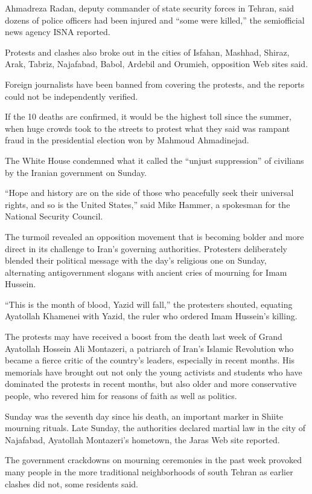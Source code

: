 ﻿\documentclass[12pt]{article}
\begin{document}
Ahmadreza Radan, deputy commander of state security forces in Tehran, said dozens of police officers
had been injured and ``some were killed,'' the semiofficial news agency ISNA reported.

Protests and clashes also broke out in the cities of Isfahan, Mashhad, Shiraz, Arak, Tabriz,
Najafabad, Babol, Ardebil and Orumieh, opposition Web sites said.

Foreign journalists have been banned from covering the protests, and the reports could not be
independently verified.

If the 10 deaths are confirmed, it would be the highest toll since the summer, when huge crowds took
to the streets to protest what they said was rampant fraud in the presidential election won by
Mahmoud Ahmadinejad.

The White House condemned what it called the ``unjust suppression'' of civilians by the Iranian
government on Sunday.

``Hope and history are on the side of those who peacefully seek their universal rights, and so is
the United States,'' said Mike Hammer, a spokesman for the National Security Council.

The turmoil revealed an opposition movement that is becoming bolder and more direct in its challenge
to Iran's governing authorities. Protesters deliberately blended their political message with the
day's religious one on Sunday, alternating antigovernment slogans with ancient cries of mourning for
Imam Hussein.

``This is the month of blood, Yazid will fall,'' the protesters shouted, equating Ayatollah Khamenei
with Yazid, the ruler who ordered Imam Hussein's killing.

The protests may have received a boost from the death last week of Grand Ayatollah Hossein Ali
Montazeri, a patriarch of Iran's Islamic Revolution who became a fierce critic of the country's
leaders, especially in recent months. His memorials have brought out not only the young activists
and students who have dominated the protests in recent months, but also older and more conservative
people, who revered him for reasons of faith as well as politics.

Sunday was the seventh day since his death, an important marker in Shiite mourning rituals. Late
Sunday, the authorities declared martial law in the city of Najafabad, Ayatollah Montazeri's
hometown, the Jaras Web site reported.

The government crackdowns on mourning ceremonies in the past week provoked many people in the more
traditional neighborhoods of south Tehran as earlier clashes did not, some residents said.
\end{document}
